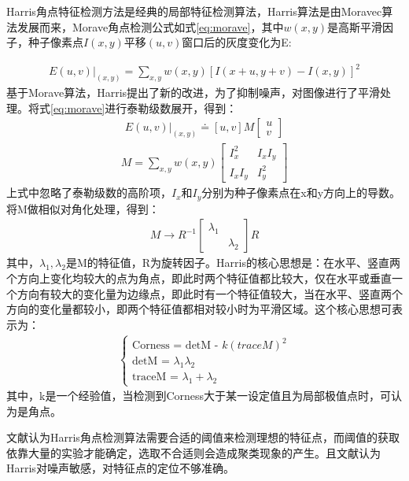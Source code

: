 Harris角点特征检测方法\cite{harris}是经典的局部特征检测算法，Harris算法是由Moravec\cite{moravec}算法发展而来，Morave角点检测公式如式\ref{eq:morave}，其中$w(x, y)$是高斯平滑因子，种子像素点$I(x, y)$平移$(u, v)$窗口后的灰度变化为E:

\begin{align}
E(u, v)|_{(x, y)} = \sum_{x, y}w(x, y)[I(x + u, y + v) - I(x, y)]^2 
\label{eq:morave}
\end{align}
基于Morave算法，Harris提出了新的改进，为了抑制噪声，对图像进行了平滑处理。将式\ref{eq:morave}进行泰勒级数展开，得到：
\begin{align}
E(u, v)|_{(x, y)} \doteq [u, v]M\left[ \begin{array}{l}
u \\
v
\end{array} \right]
\end{align}
\begin{align}
M = \sum_{x, y} w(x, y)\left[ \begin{array}{ll}
I_x^2 & I_xI_y\\
I_xI_y & I_y^2
\end{array} \right]
\end{align}
上式中忽略了泰勒级数的高阶项，$I_x$和$I_y$分别为种子像素点在x和y方向上的导数。将M做相似对角化处理，得到：
\begin{align}
M \to R^{-1}\left[ \begin{array}{ll}
\lambda_1 & \\
 & \lambda_2
\end{array} \right]R
\end{align}
其中，$\lambda_1, \lambda_2$是M的特征值，R为旋转因子。Harris的核心思想是：在水平、竖直两个方向上变化均较大的点为角点，即此时两个特征值都比较大，仅在水平或垂直一个方向有较大的变化量为边缘点，即此时有一个特征值较大，当在水平、竖直两个方向的变化量都较小，即两个特征值都相对较小时为平滑区域。这个核心思想可表示为：
\begin{align}
\left\{ \begin{array}{l}
\textrm{Corness = detM - $k(traceM)^2$} \\
\textrm{detM = $\lambda_1\lambda_2$} \\
\textrm{traceM = $\lambda_1 + \lambda_2$}
\end{array} \right.
\end{align}
其中，k是一个经验值，当检测到Corness大于某一设定值且为局部极值点时，可认为是角点。

文献\cite{yezhiyong}认为Harris角点检测算法需要合适的阈值来检测理想的特征点，而阈值的获取依靠大量的实验才能确定，选取不合适则会造成聚类现象的产生。且文献\cite{zhangyong}认为Harris对噪声敏感，对特征点的定位不够准确。

